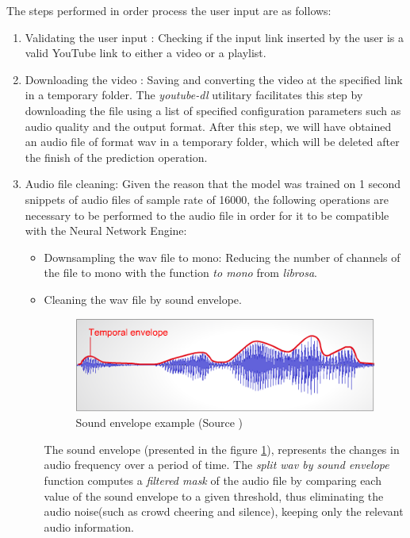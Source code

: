 The steps performed in order process the user input are as follows:
\begin{enumerate}

	\item Validating the user input : Checking if the input link inserted by the user is a valid YouTube link to
	either a video or a playlist.
	\item Downloading the video : Saving and converting the video at the specified link in a temporary folder.
		The \textit{youtube-dl} utilitary facilitates this step by downloading the file using
	a list of specified configuration parameters such as audio quality and the output format. After this step,
	we will have obtained an audio file of format wav in a temporary folder, which will be deleted after
	the finish of the prediction operation.
	\item Audio file cleaning: Given the reason that the model was trained on 1 second snippets of audio files of sample rate of 16000,
		the following operations are necessary to be performed to the audio file in order for it to be compatible with the Neural Network Engine:
		\begin{itemize}
			\item Downsampling the wav file to mono: Reducing the number of channels of the file to
			mono with the function \textit{to mono} from \textit{librosa}.
			\item Cleaning the wav file by sound envelope.
			\begin{figure}[H]
				\centering
				\includegraphics{images/soundenvelope.png}
				\caption{Sound envelope example (Source \cite{sev})}
			\label{se}
			\end{figure}

	The sound envelope (presented in the figure \ref{se}), represents the changes in audio frequency over a period
	of time. The \textit{split wav by sound envelope} function computes a \textit{filtered mask} of the audio file
	by comparing each value of the sound envelope to a given threshold, thus eliminating the audio noise(such as
	crowd cheering and silence), keeping only the relevant audio information.


\end{itemize}
\end{enumerate}
